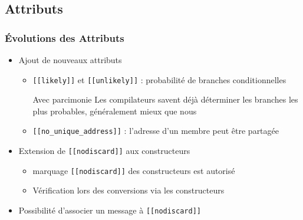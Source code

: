 \documentclass[C++.tex]{subfiles}
\begin{document}
\subsection*{Attributs}
\begin{frame}[fragile]
	\frametitle{Évolutions des Attributs}
	\begin{itemize}
		\item Ajout de nouveaux attributs
		\begin{itemize}
			\item \lstinline|[[likely]]| et \lstinline|[[unlikely]]| : probabilité de branches conditionnelles


			\begin{alertblock}{Avec parcimonie}
				Les compilateurs savent déjà déterminer les branches les plus probables, généralement mieux que nous 
			\end{alertblock}

			\item \lstinline|[[no_unique_address]]| : l'adresse d'un membre peut être partagée
		
		\end{itemize}

		\item Extension de \lstinline|[[nodiscard]]| aux constructeurs
		\begin{itemize}
			\item marquage \lstinline|[[nodiscard]]| des constructeurs est autorisé


			\item Vérification lors des conversions via les constructeurs

		\end{itemize}
		\item Possibilité d'associer un message à \lstinline|[[nodiscard]]|

	\end{itemize}
\end{frame}
\end{document}
